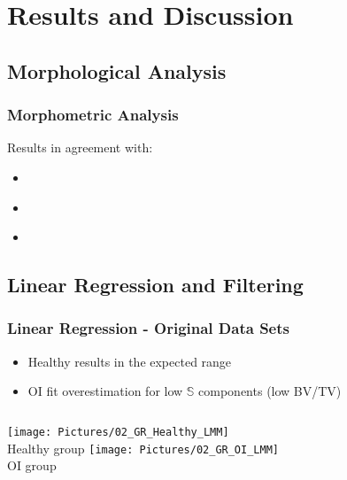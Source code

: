 \documentclass[xcolor=table,11pt]{beamer}
\begin{document}

\section{Results and Discussion}
\subsection{Morphological Analysis}
\begin{frame}
	\frametitle{Morphometric Analysis}
	\begin{table}[]
		\centering
		\caption{Summary of morphometric analysis\vspace{-1em}}
		\label{Table2}
	\end{table}\vfill
	Results in agreement with:
	\begin{itemize}
		\item \cite{p9}
		\item \cite{p10}
		\item \cite{p11}
	\end{itemize}
\end{frame}


\subsection{Linear Regression and Filtering}
\begin{frame}
	\frametitle{Linear Regression - Original Data Sets}
	\begin{itemize}
		\item Healthy results in the expected range
		\item OI fit overestimation for low $\mathbb{S}$ components (low BV/TV)
	\end{itemize}
	\begin{columns}
		\centering
		\texttt{[image: Pictures/02\_GR\_Healthy\_LMM]}\\
		Healthy group
		\centering
		\texttt{[image: Pictures/02\_GR\_OI\_LMM]}\\
		OI group
	\end{columns}	
\end{frame}
\end{document}
